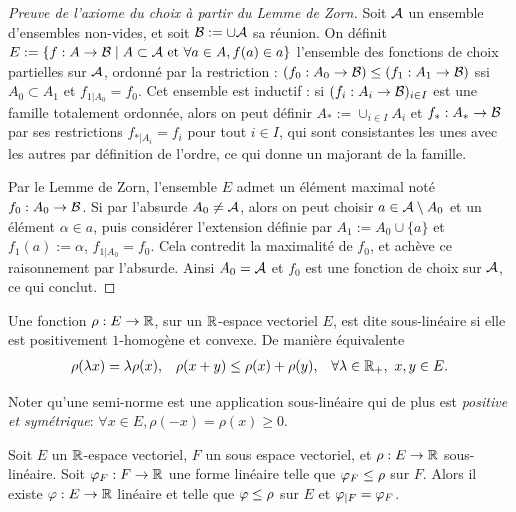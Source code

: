 \begin{proof}[Preuve de l'axiome du choix à partir du Lemme de Zorn]
	Soit $\mathcal{A}$ un ensemble d'ensembles non-vides, et soit $\mathcal{B} := \cup \mathcal{A}$ sa réunion. On définit $E := \{f : A \to \mathcal{B} \mid A \subset \mathcal{A} \text{ et } \forall a \in A, f(a) \in a\}$ l'ensemble des fonctions de choix partielles sur $\mathcal{A}$, ordonné par la restriction : $(f_0 : A_0 \to \mathcal{B}) \leq (f_1 : A_1 \to \mathcal{B})$ ssi $A_0 \subset A_1$ et $f_{1|A_0} = f_0$. 
	Cet ensemble est inductif : si $(f_i : A_i \to \mathcal{B})_{i \in I}$ est une famille totalement ordonnée, alors on peut définir $A_* := \cup_{i \in I} A_i$ et $f_* : A_* \to \mathcal{B}$ par ses restrictions $f_{*|A_i} = f_i$ pour tout $i \in I$, qui sont consistantes les unes avec les autres par définition de l'ordre, ce qui donne un majorant de la famille. 
	
	Par le Lemme de Zorn, l'ensemble $E$ admet un élément maximal noté $f_0 : A_0 \to \mathcal{B}$. Si par l'absurde $A_0 \neq \mathcal{A}$, alors on peut choisir $a \in \mathcal{A}\setminus A_0$ et un élément $\alpha \in a$, puis considérer l'extension définie par $A_1 := A_0 \cup\{a\}$ et $f_1(a) := \alpha$, $f_{1|A_0} = f_0$. Cela contredit la maximalité de $f_0$, et achève ce raisonnement par l'absurde. 
	Ainsi $A_0 = \mathcal{A}$ et $f_0$ est une fonction de choix sur $\mathcal{A}$, ce qui conclut. %
\end{proof}


\begin{definition}
\label{def:sousLin}
%
Une fonction $\rho : E \to \mathbb{R}$, sur un $\mathbb{R}$-espace vectoriel $E$, est dite sous-linéaire si elle est positivement $1$-homogène et convexe. De manière équivalente
\begin{align*}
	\rho(\lambda x) &= \lambda \rho(x),&
	\rho(x+y) &\leq \rho(x)+\rho(y), &
	\forall \lambda \in \mathbb{R}_+,\ x, y \in E.
\end{align*}
\end{definition}

Noter qu'une semi-norme est une application sous-linéaire qui de plus est \emph{positive et symétrique}: $\forall x\in E, \rho(-x) = \rho(x) \geq 0$.

\begin{theorem}
\label{th:HahnBanach}
%
	Soit $E$ un $\mathbb{R}$-espace vectoriel, $F$ un sous espace vectoriel, et $\rho : E \to \mathbb{R}$ sous-linéaire. 
	Soit $\varphi_F : F \to \mathbb{R}$ une forme linéaire telle que $\varphi_F \leq \rho$ sur $F$.
	Alors il existe $\varphi : E \to \mathbb{R}$ linéaire et telle que $\varphi \leq \rho$ sur $E$ et $\varphi_{|F} = \varphi_F$. 
\end{theorem}

